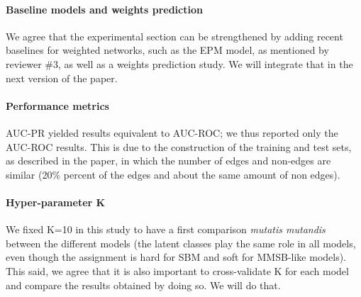 \documentclass{article}
\begin{document}
\paragraph{Baseline models and weights prediction} We agree that the experimental section can be strengthened by adding recent baselines for weighted networks, such as the EPM model, as mentioned by reviewer \#3, as well as a weights prediction study. We will integrate that in the next version of the paper.

\paragraph{Performance metrics}  AUC-PR yielded results equivalent to AUC-ROC; we thus reported only the AUC-ROC results. This is due to the construction of the training and test sets, as described in the paper, in which the number of edges and non-edges are similar (20\% percent of the edges and about the same amount of non edges).

\paragraph{Hyper-parameter K} We fixed K=10 in this study to have a first comparison \textit{mutatis mutandis} between the different models (the latent classes play the same role in all models, even though the assignment is hard for SBM and soft for MMSB-like models). This said, we agree that it is also important to cross-validate K for each model and compare the results obtained by doing so. We will do that.
\end{document}
